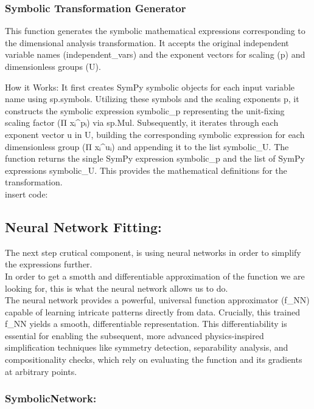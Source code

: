 \documentclass{article}
\begin{document}
\subsubsection{Symbolic Transformation Generator}

This function generates the symbolic mathematical expressions corresponding to the dimensional analysis transformation. It accepts the original independent variable names (independent_vars) and the exponent vectors for scaling (p) and dimensionless groups (U).

How it Works: It first creates SymPy symbolic objects for each input variable name using sp.symbols. Utilizing these symbols and the scaling exponents p, it constructs the symbolic expression symbolic_p representing the unit-fixing scaling factor (Π xᵢ^pᵢ) via sp.Mul. Subsequently, it iterates through each exponent vector u in U, building the corresponding symbolic expression for each dimensionless group (Π xᵢ^uᵢ) and appending it to the list symbolic_U. The function returns the single SymPy expression symbolic_p and the list of SymPy expressions symbolic_U. This provides the mathematical definitions for the transformation.\\

insert code:\\

\subsection{Neural Network Fitting: }

The next step crutical component, is using neural networks in order to simplify the expressions further.\\
In order to get a smotth and differentiable approximation of the function we are looking for, this is what the neural network allows us to do.\\ 
The neural network provides a powerful, universal function approximator (f_NN) capable of learning intricate patterns directly from data. Crucially, this trained f_NN yields a smooth, differentiable representation. This differentiability is essential for enabling the subsequent, more advanced physics-inspired simplification techniques like symmetry detection, separability analysis, and compositionality checks, which rely on evaluating the function and its gradients at arbitrary points.\\

\subsubsection{SymbolicNetwork: }
\end{document}
